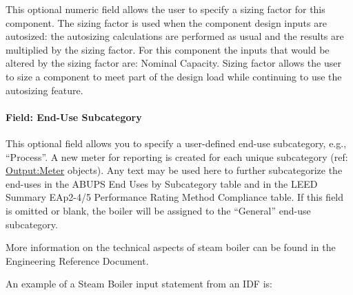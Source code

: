 This optional numeric field allows the user to specify a sizing factor for this component. The sizing factor is used when the component design inputs are autosized: the autosizing calculations are performed as usual and the results are multiplied by the sizing factor. For this component the inputs that would be altered by the sizing factor are: Nominal Capacity. Sizing factor allows the user to size a component to meet part of the design load while continuing to use the autosizing feature.

\paragraph{Field: End-Use Subcategory}\label{end-use-subcategory-11}

This optional field allows you to specify a user-defined end-use subcategory, e.g., ``Process''. A new meter for reporting is created for each unique subcategory (ref: \hyperref[outputmeter-and-outputmetermeterfileonly]{Output:Meter} objects). Any text may be used here to further subcategorize the end-uses in the ABUPS End Uses by Subcategory table and in the LEED Summary EAp2-4/5 Performance Rating Method Compliance table. If this field is omitted or blank, the boiler will be assigned to the ``General'' end-use subcategory.


More information on the technical aspects of steam boiler can be found in the Engineering Reference Document.

An example of a Steam Boiler input statement from an IDF is:


